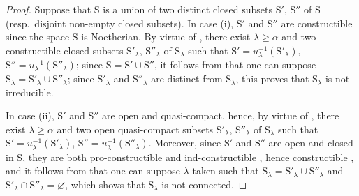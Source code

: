 \begin{proof}
Suppose that $\mathrm{S}$ is a union of two distinct closed subsets $\mathrm{S}'$, $\mathrm{S}''$ of $\mathrm{S}$ (resp.\ disjoint non-empty closed subsets).
In case (i), $\mathrm{S}'$ and $\mathrm{S}''$ are constructible since the space $\mathrm{S}$ is Noetherian.
By virtue of , there exist $\lambda\geqslant\alpha$ and two constructible closed subsets $\mathrm{S}'_\lambda$, $\mathrm{S}''_\lambda$ of $\mathrm{S}_\lambda$ such that $\mathrm{S}'=u_\lambda^{-1}(\mathrm{S}'_\lambda)$, $\mathrm{S}''=u_\lambda^{-1}(\mathrm{S}''_\lambda)$; since $\mathrm{S}=\mathrm{S}'\cup\mathrm{S}''$, it follows from  that one can suppose $\mathrm{S}_\lambda=\mathrm{S}'_\lambda\cup\mathrm{S}''_\lambda$; since $\mathrm{S}'_\lambda$ and $\mathrm{S}''_\lambda$ are distinct from $\mathrm{S}_\lambda$, this proves that $\mathrm{S}_\lambda$ is not irreducible.

In case (ii), $\mathrm{S}'$ and $\mathrm{S}''$ are open and quasi-compact, hence, by virtue of , there exist $\lambda\geqslant\alpha$ and two open quasi-compact subsets $\mathrm{S}'_\lambda$, $\mathrm{S}''_\lambda$ of $\mathrm{S}_\lambda$ such that $\mathrm{S}'=u_\lambda^{-1}(\mathrm{S}'_\lambda)$, $\mathrm{S}''=u_\lambda^{-1}(\mathrm{S}''_\lambda)$.
Moreover, since $\mathrm{S}'$ and $\mathrm{S}''$ are open and closed in $\mathrm{S}$, they are both pro-constructible and ind-constructible , hence constructible , and it follows from  that one can suppose $\lambda$ taken such that $\mathrm{S}_\lambda=\mathrm{S}'_\lambda\cup\mathrm{S}''_\lambda$ and $\mathrm{S}'_\lambda\cap\mathrm{S}''_\lambda=\varnothing$, which shows that $\mathrm{S}_\lambda$ is not connected.
\end{proof}

